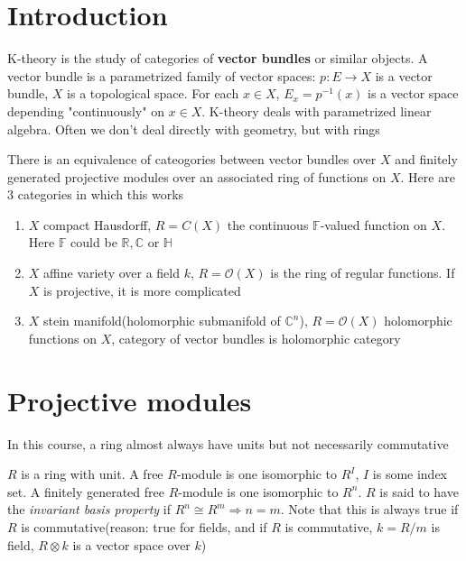 \documentclass[main]{subfiles}
\begin{document}
\section{Introduction}

K-theory is the study of categories of \textbf{vector bundles} or similar objects. A vector bundle is a parametrized family of vector spaces: $p:E\to X$ is a vector bundle, $X$ is a topological space. For each $x\in X$, $E_x=p^{-1}(x)$ is a vector space depending "continuously" on $x\in X$. K-theory deals with parametrized linear algebra. Often we don't deal directly with geometry, but with rings

\begin{theorem}\label{Swan-Serre Theorem}
There is an equivalence of cateogories between vector bundles over $X$ and finitely generated projective modules over an associated ring of functions on $X$. Here are 3 categories in which this works
\begin{enumerate}
\item $X$ compact Hausdorff, $R=C(X)$ the continuous $\mathbb F$-valued function on $X$. Here $\mathbb F$ could be $\mathbb R,\mathbb C$ or $\mathbb H$
\item $X$ affine variety over a field $k$, $R=\mathcal O(X)$ is the ring of regular functions. If $X$ is projective, it is more complicated
\item $X$ stein manifold(holomorphic submanifold of $\mathbb C^n$), $R=\mathcal O(X)$ holomorphic functions on $X$, category of vector bundles is holomorphic category
\end{enumerate}
\end{theorem}

\section{Projective modules}
In this course, a ring almost always have units but not necessarily commutative

\begin{definition}
$R$ is a ring with unit. A free $R$-module is one isomorphic to $R^I$, $I$ is some index set. A finitely generated free $R$-module is one isomorphic to $R^n$. $R$ is said to have the \textit{invariant basis property} if $R^n\cong R^m\Rightarrow n=m$. Note that this is always true if $R$ is commutative(reason: true for fields, and if $R$ is commutative, $k=R/m$ is field, $R\otimes k$ is a vector space over $k$)
\end{definition}
\end{document}
